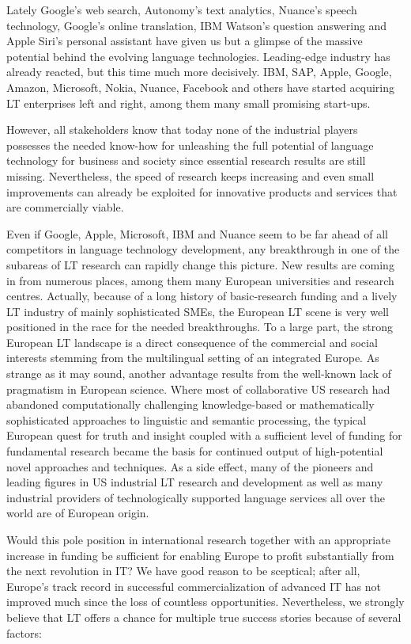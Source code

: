 \documentclass[10pt, plain]{../../metanetpaper}
\begin{document}
\begin{multicols}{2}
Lately Google's web search, Autonomy's text analytics, Nuance's speech technology, Google's online translation, IBM Watson's question answering and Apple Siri's personal assistant have given us but a glimpse of the massive potential behind the evolving language technologies. Leading-edge industry has already reacted, but this time much more decisively. IBM, SAP, Apple, Google, Amazon, Microsoft, Nokia, Nuance, Facebook and others have started acquiring LT enterprises left and right, among them many small promising start-ups.

However, all stakeholders know that today none of the industrial players possesses the needed know-how for unleashing the full potential of language technology for business and society since essential research results are still missing. Nevertheless, the speed of research keeps increasing and even small improvements can already be exploited for innovative products and services that are commercially viable.

Even if Google, Apple, Microsoft, IBM and Nuance seem to be far ahead of all competitors in language technology development, any breakthrough in one of the subareas of LT research can rapidly change this picture. New results are coming in from numerous places, among them many European universities and research centres. Actually, because of a long history of basic-research funding and a lively LT industry of mainly sophisticated SMEs, the European LT scene is very well positioned in the race for the needed breakthroughs. To a large part, the strong European LT landscape is a direct consequence of the commercial and social interests stemming from the multilingual setting of an integrated Europe. As strange as it may sound, another advantage results from the well-known lack of pragmatism in European science. Where most of collaborative US research had abandoned computationally challenging knowledge-based or mathematically sophisticated approaches to linguistic and semantic processing, the typical European quest for truth and insight coupled with a sufficient level of funding for fundamental research became the basis for continued output of high-potential novel approaches and techniques. As a side effect, many of the pioneers and leading figures in US industrial LT research and development as well as many industrial providers of technologically supported language services all over the world are of European origin.

Would this pole position in international research together with an appropriate increase in funding be sufficient for enabling Europe to profit substantially from the next revolution in IT? We have good reason to be sceptical; after all, Europe’s track record in successful commercialization of advanced IT has not improved much since the loss of countless opportunities. Nevertheless, we strongly believe that LT offers a chance for multiple true success stories because of several factors:


\end{multicols}
\end{document}
